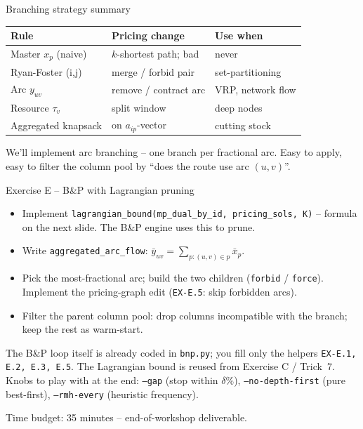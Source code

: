 \documentclass[10pt,aspectratio=169]{beamer}
\begin{document}
\begin{frame}{Branching strategy summary}
  \begin{tabular}{@{}p{}p{}p{}@{}}
    \toprule
    Rule & Pricing change & Use when \\
    \midrule
    Master $x_p$ (naive) & $k$-shortest path; bad & never \\
    Ryan-Foster (i,j) & merge / forbid pair & set-partitioning \\
    Arc $y_{uv}$ & remove / contract arc & VRP, network flow \\
    Resource $\tau_v$ & split window & deep nodes \\
    Aggregated knapsack & on $a_{ip}$-vector & cutting stock \\
    \bottomrule
  \end{tabular}
  \medskip
  \begin{keybox}
    We'll implement \alert{arc branching} -- one branch per fractional arc.
    Easy to apply, easy to filter the column pool by ``does the route use
    arc $(u,v)$''.
  \end{keybox}
\end{frame}

\begin{frame}{Exercise E -- B\&P with Lagrangian pruning}
  \begin{exbox}
    \begin{itemize}\small
      \item Implement
            \texttt{lagrangian\_bound(mp\_dual\_by\_id, pricing\_sols, K)}
            -- formula on the next slide. The B\&P engine uses this to prune.
      \item Write
            \texttt{aggregated\_arc\_flow}: $\bar y_{uv}\!=\!\sum_{p:(u,v)\in p}\bar x_p$.
      \item Pick the most-fractional arc; build the two children
            (\texttt{forbid} / \texttt{force}). Implement the
            pricing-graph edit (\texttt{EX-E.5}: skip forbidden arcs).
      \item Filter the parent column pool: drop columns incompatible with
            the branch; keep the rest as warm-start.
    \end{itemize}
    The B\&P loop itself is already coded in \texttt{bnp.py}; you fill
    only the helpers \texttt{EX-E.1, E.2, E.3, E.5}. The Lagrangian
    bound is reused from Exercise C / Trick~7. Knobs to play with at the
    end: \texttt{--gap} (stop within $\delta\%$),
    \texttt{--no-depth-first} (pure best-first),
    \texttt{--rmh-every} (heuristic frequency).

    \alert{Time budget: 35 minutes -- end-of-workshop deliverable.}
  \end{exbox}
\end{frame}
\end{document}
